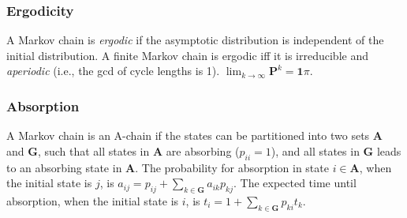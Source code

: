 \subsubsection{Ergodicity}
A Markov chain is \emph{ergodic} if the asymptotic distribution is independent of the initial distribution.
A finite Markov chain is ergodic iff it is irreducible and \emph{aperiodic} (i.e., the gcd of cycle lengths is 1).
$\lim_{k\rightarrow\infty}\mathbf{P}^k = \mathbf{1}\pi$.

\subsubsection{Absorption}
A Markov chain is an A-chain if the states can be partitioned into two sets $\mathbf{A}$ and $\mathbf{G}$, such that all states in $\mathbf{A}$ are absorbing ($p_{ii}=1$), and all states in $\mathbf{G}$ leads to an absorbing state in $\mathbf{A}$.
The probability for absorption in state $i\in\mathbf{A}$, when the initial state is $j$, is $a_{ij} = p_{ij}+\sum_{k\in\mathbf{G}} a_{ik}p_{kj}$.
The expected time until absorption, when the initial state is $i$, is $t_i = 1+\sum_{k\in\mathbf{G}}p_{ki}t_k$.

\hardcolumnbreak
